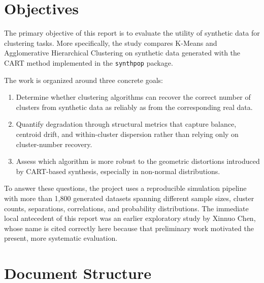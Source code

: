 \section{Objectives}
\label{sec:objectives}

The primary objective of this report is to evaluate the utility of synthetic data for clustering tasks. More specifically, the study compares K-Means and Agglomerative Hierarchical Clustering on synthetic data generated with the CART method implemented in the \texttt{synthpop} package.

The work is organized around three concrete goals:
\begin{enumerate}
  \item Determine whether clustering algorithms can recover the correct number of clusters from synthetic data as reliably as from the corresponding real data.
  \item Quantify degradation through structural metrics that capture balance, centroid drift, and within-cluster dispersion rather than relying only on cluster-number recovery.
  \item Assess which algorithm is more robust to the geometric distortions introduced by CART-based synthesis, especially in non-normal distributions.
\end{enumerate}

To answer these questions, the project uses a reproducible simulation pipeline with more than 1,800 generated datasets spanning different sample sizes, cluster counts, separations, correlations, and probability distributions. The immediate local antecedent of this report was an earlier exploratory study by Xinnuo Chen, whose name is cited correctly here because that preliminary work motivated the present, more systematic evaluation.

\section{Document Structure}
\label{sec:document-structure}


